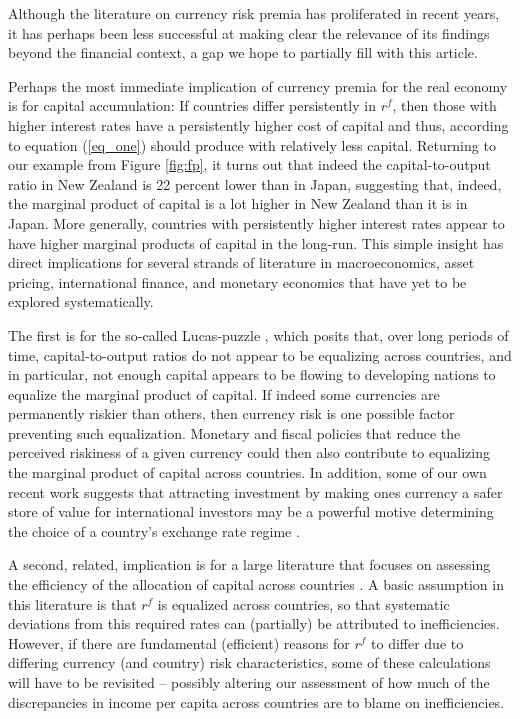 \documentclass{ar-1col}
\begin{document}
Although the literature on currency risk premia has proliferated in recent years, it has perhaps been less successful at making clear the relevance of its findings beyond the financial context, a gap we hope to partially fill with this article.

Perhaps the most immediate implication of currency premia for the real economy is for capital accumulation: If countries differ persistently in $r^f$, then those with higher interest rates have a persistently higher cost of capital and thus, according to equation (\ref{eq_one}) should produce with relatively less capital. Returning to our example from Figure \ref{fig:fp}, it turns out that indeed the capital-to-output ratio in New Zealand is 22 percent lower than in Japan, suggesting that, indeed, the marginal product of capital is a lot higher in New Zealand than it is in Japan. More generally, countries with persistently higher interest rates appear to have higher marginal products of capital in the long-run. This simple insight has direct implications for several strands of literature in macroeconomics, asset pricing, international finance, and monetary economics that have yet to be explored systematically.

The first is for the so-called Lucas-puzzle \citep{Lucas1990}, which posits that, over long periods of time, capital-to-output ratios do not appear to be equalizing across countries, and in particular, not enough capital appears to be flowing to developing nations to equalize the marginal product of capital. If indeed some currencies are permanently riskier than others, then currency risk is one possible factor preventing such equalization. Monetary and fiscal policies that reduce the perceived riskiness of a given currency could then also contribute to equalizing the marginal product of capital across countries. In addition, some of our own recent work suggests that attracting investment by making ones currency a safer store of value for international investors may be a powerful motive determining the choice of a country's exchange rate regime \citep{HassanMertensZhang2020}.

A second, related, implication is for a large literature that focuses on assessing the efficiency of the allocation of capital across countries \citep{HallJones1997, CaselliFeyrer2007}. A basic assumption in this literature is that $r^f$ is equalized across countries, so that systematic deviations from this required rates can (partially) be attributed to inefficiencies. However, if there are fundamental (efficient) reasons for $r^f$ to differ due to differing currency (and country) risk characteristics, some of these calculations will have to be revisited -- possibly altering our assessment of how much of the discrepancies in income per capita across countries are to blame on inefficiencies.
\end{document}
